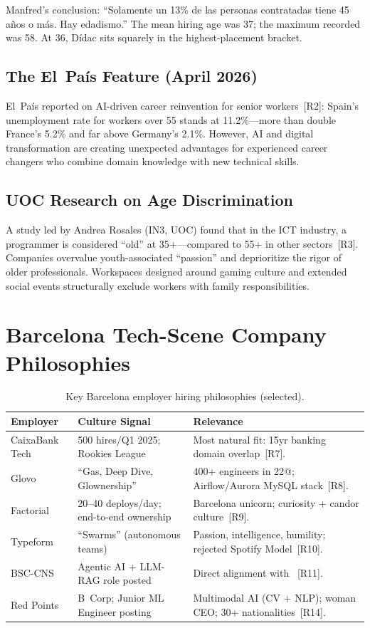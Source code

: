 \documentclass[a4paper,11pt,openany]{report}
\begin{document}
Manfred's conclusion: ``Solamente un 13\% de las personas contratadas tiene 45
años o más. Hay edadismo.'' The mean hiring age was 37; the maximum recorded
was 58. At 36, Dídac sits squarely in the highest-placement bracket.

\subsection{The El~País Feature (April 2026)}

El~País reported on AI-driven career reinvention for senior workers~[R2]:
Spain's unemployment rate for workers over 55 stands at 11.2\%---more than
double France's 5.2\% and far above Germany's 2.1\%. However, AI and digital
transformation are creating unexpected advantages for experienced career
changers who combine domain knowledge with new technical skills.

\subsection{UOC Research on Age Discrimination}

A study led by Andrea Rosales (IN3, UOC) found that in the ICT industry, a
programmer is considered ``old'' at 35+---compared to 55+ in other
sectors~[R3]. Companies overvalue youth-associated ``passion'' and deprioritize
the rigor of older professionals. Workspaces designed around gaming culture and
extended social events structurally exclude workers with family
responsibilities.

\section{Barcelona Tech-Scene Company Philosophies}

\begin{table}[htbp]
\centering
\caption{Key Barcelona employer hiring philosophies (selected).}
\label{tab:company-philosophy}
\small
\begin{tabularx}{\textwidth}{l l X}
\toprule
\textbf{Employer} & \textbf{Culture Signal} & \textbf{Relevance} \\
\midrule
CaixaBank Tech & 500 hires/Q1 2025; Rookies League & Most natural fit: 15yr banking domain overlap~[R7]. \\
Glovo & ``Gas, Deep Dive, Glownership'' & 400+ engineers in 22@; Airflow/Aurora MySQL stack~[R8]. \\
Factorial & 20--40 deploys/day; end-to-end ownership & Barcelona unicorn; curiosity + candor culture~[R9]. \\
Typeform & ``Swarms'' (autonomous teams) & Passion, intelligence, humility; rejected Spotify Model~[R10]. \\
BSC-CNS & Agentic AI + LLM-RAG role posted & Direct alignment with \projectName{}~[R11]. \\
Red Points & B~Corp; Junior ML Engineer posting & Multimodal AI (CV + NLP); woman CEO; 30+ nationalities~[R14]. \\
\bottomrule
\end{tabularx}
\end{table}
\end{document}
